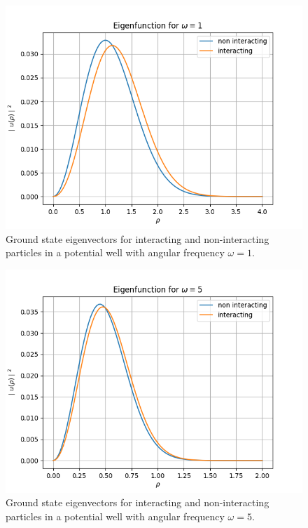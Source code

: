 \documentclass{emulateapj}
\begin{document}
\begin{figure}[H]
    \centering
    \includegraphics[scale=0.5]{omega1.png}
    \caption{Ground state eigenvectors for interacting and non-interacting particles in a potential well with angular frequency $\omega = 1$.}
    \label{fig:5}
\end{figure}
\begin{figure}[H]
    \centering
    \includegraphics[scale=0.5]{omega5.png}
    \caption{Ground state eigenvectors for interacting and non-interacting particles in a potential well with angular frequency $\omega = 5$.}
    \label{fig:6}
\end{figure}
\\
\\
\end{document}
